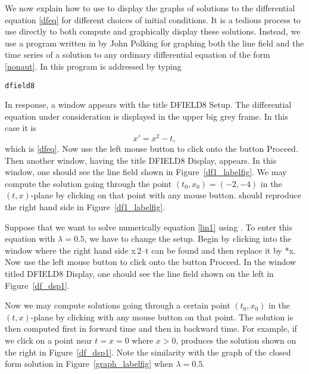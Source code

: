 \documentclass{ximera}
\begin{document}
We now explain how to use \Matlab to display the graphs of
solutions to the differential equation \eqref{dfeq} for different
choices of initial conditions.  It is a tedious process to use
\Matlab directly to both compute and graphically display these
solutions.  Instead, we use a program written in \Matlab by John
Polking for graphing both the line field and the time 
series of a solution to any ordinary differential equation of the form
\eqref{nonaut}.  In \Matlab this program is addressed by typing
\begin{verbatim}
dfield8
\end{verbatim}
In response, a window appears with the title {\sf
DFIELD8 Setup.}  The differential equation under consideration is 
displayed in the upper big grey frame.  In this case it is
\[
	x' = x^2 - t,
\]
which is \eqref{dfeq}.  Now use the left 
mouse button to click onto the button {\sf Proceed}.  
Then another window, having the title {\sf DFIELD8 Display},
appears.  In this window, one should see the line
field shown in Figure~\ref{df1_labelfig}.  We may compute the
solution going through the point $(t_0,x_0)=(-2,-4)$ in the
$(t,x)$-plane by clicking on that point with any mouse button.
{\dfield} should reproduce the right hand side in
Figure~\ref{df1_labelfig}.

Suppose that we want to solve numerically equation \eqref{lin1}
using {\dfield}. To enter this equation with $\lambda = 0.5$,
we have to change the setup.  Begin by clicking into the window
where the right hand side {\sf x\^{$\,\!$}2--t} can be found and
then replace it by {*x}.  Now use the left mouse button
to click onto the button {\sf Proceed}.  In the window titled
{\sf DFIELD8 Display}, one should see the line field
 shown on
the left in Figure~\ref{df_dsp1}.
\begin{figure*}[htb]
    \centerline{%
    }
    \caption{Left: Line field for $\dot{x}=0.5x$ for $t\in [-4,10]$ and
		$x\in [-4,4]$.  Right: A solution starting at $t=0$ and
		$x>0$ but small.}
    \label{df_dsp1}
\end{figure*}

Now we may compute solutions going through a certain point
$(t_0,x_0)$ in the $(t,x)$-plane by clicking with any mouse
button on that point.  The solution is then computed first in
forward time and then in backward time.  For example, if we
click on a point near $t=x=0$ where $x>0$, {\dfield} produces
the solution shown on the right in Figure~\ref{df_dsp1}.  Note
the similarity with the graph of the closed form solution in
Figure~\ref{graph_labelfig} when $\lambda=0.5$.
\end{document}
